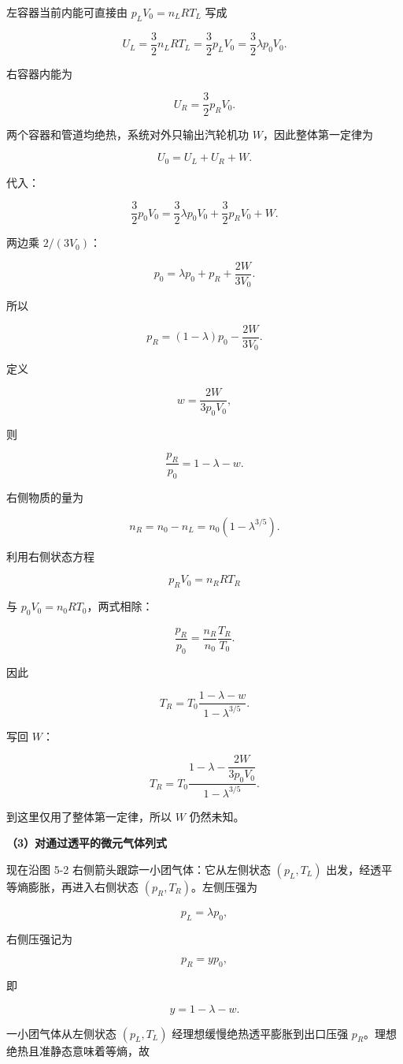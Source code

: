 \documentclass[12pt,a4paper,UTF8]{ctexart}
\begin{document}
左容器当前内能可直接由 \(p_LV_0=n_LRT_L\) 写成

\[
U_L=\frac32n_LRT_L
=\frac32p_LV_0
=\frac32\lambda p_0V_0.
\]

右容器内能为

\[U_R=\frac32p_RV_0.\]

两个容器和管道均绝热，系统对外只输出汽轮机功 \(W\)，因此整体第一定律为

\[U_0=U_L+U_R+W.\]

代入：

\[
\frac32p_0V_0
=\frac32\lambda p_0V_0
+\frac32p_RV_0+W.
\]

两边乘 \(2/(3V_0)\)：

\[p_0=\lambda p_0+p_R+\frac{2W}{3V_0}.\]

所以

\[
\boxed{
p_R=(1-\lambda)p_0-\frac{2W}{3V_0}
}.
\]

定义

\[w=\frac{2W}{3p_0V_0},\]

则

\[
\boxed{\frac{p_R}{p_0}=1-\lambda-w}.
\]

右侧物质的量为

\[
n_R=n_0-n_L
=n_0(1-\lambda^{3/5}).
\]

利用右侧状态方程

\[p_RV_0=n_RRT_R\]

与 \(p_0V_0=n_0RT_0\)，两式相除：

\[
\frac{p_R}{p_0}
=\frac{n_R}{n_0}\frac{T_R}{T_0}.
\]

因此

\[
\boxed{
T_R=T_0\frac{1-\lambda-w}{1-\lambda^{3/5}}
}.
\]

写回 \(W\)：

\[
\boxed{
T_R=T_0
\frac{1-\lambda-\dfrac{2W}{3p_0V_0}}
{1-\lambda^{3/5}}
}.
\]

到这里仅用了整体第一定律，所以 \(W\) 仍然未知。

\textbf{（3）对通过透平的微元气体列式}

现在沿图 5-2 右侧箭头跟踪一小团气体：它从左侧状态 \((p_L,T_L)\)
出发，经透平等熵膨胀，再进入右侧状态 \((p_R,T_R)\)。左侧压强为

\[p_L=\lambda p_0,\]

右侧压强记为

\[p_R=yp_0,\]

即

\[y=1-\lambda-w.\]

一小团气体从左侧状态 \((p_L,T_L)\) 经理想缓慢绝热透平膨胀到出口压强
\(p_R\)。理想绝热且准静态意味着等熵，故
\end{document}
